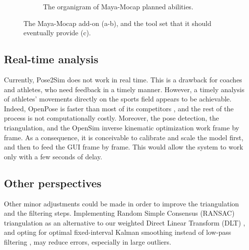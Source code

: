 \begin{figure}[hbtp]
\begin{subfigure}[b]{1\textwidth}
            \caption{The organigram of Maya-Mocap planned abilities.}
      \end{subfigure}
 	\caption{The Maya-Mocap add-on (a-b), and the tool set that it should eventually provide (c).}
	\label{fig_mayamocap}
\end{figure}

\clearpage

\subsection{Real-time analysis}\label{subsec:realtime}

Currently, Pose2Sim does not work in real time. This is a drawback for coaches and athletes, who need feedback in a timely manner. However, a timely analysis of athletes’ movements directly on the sports field appears to be achievable. Indeed, OpenPose is faster than most of its competitors \cite{Chen2020}, and the rest of the process is not computationally costly. Moreover, the pose detection, the triangulation, and the OpenSim inverse kinematic optimization work frame by frame. As a consequence, it is conceivable to calibrate and scale the model first, and then to feed the GUI frame by frame. This would allow the system to work only with a few seconds of delay.


\subsection{Other perspectives}

Other minor adjustments could be made in order to improve the triangulation and the filtering steps. Implementing Random Simple Consensus (RANSAC) triangulation \cite{Fischler1981} as an alternative to our weighted Direct Linear Transform (DLT) \cite{Pagnon2021}, and opting for optimal fixed-interval Kalman smoothing instead of low-pass filtering \cite{Rauch1965,Needham2021a}, may reduce errors, especially in large outliers.